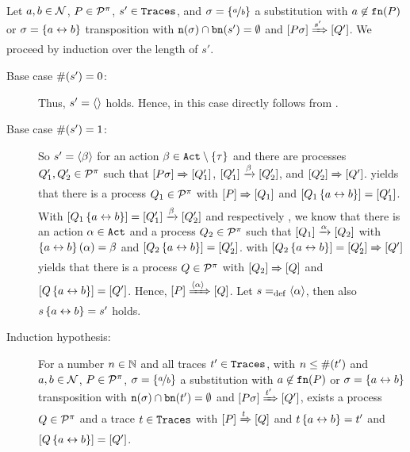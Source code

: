 \begin{prf}
Let $a,b\in\mathcal N$, $P\in\mathcal P^{\pi}$, $s'\in\mathtt{Traces}$, and $\sigma=\left\{\nicefrac{a}{b}\right\}$ a substitution with $a\not\in\mathtt{fn}(P)$ or $\sigma=\left\{a\leftrightarrow{}b\right\}$ transposition with $\mathtt{n}(\sigma)\cap\mathtt{bn}(s')=\emptyset$ and $\left[P\sigma\right]\xRightarrow{s'}\left[Q'\right]$. We proceed by induction over the length of $s'$.
\begin{description}
\item[Base case $\#(s')=0$:] Thus, $s'=\langle\rangle{}$ holds. Hence, in this case  directly follows from .

\item[Base case $\#(s')=1$:] So $s'=\langle\beta\rangle$ for an action $\beta\in\actions\setminus\set{\tau}$ and there are processes $Q_1',Q_2'\in\mathcal P^{\pi}$ such that $\left[P\sigma\right]\xRightarrow{}\left[Q_1'\right]$, $\left[Q_1'\right]\xrightarrow{\beta}\left[Q_2'\right]$, and $\left[Q_2'\right]\xRightarrow{}\left[Q'\right]$.  yields that there is a process $Q_1\in\mathcal P^{\pi}$ with $\left[P\right]\xRightarrow{}\left[Q_1\right]$ and $\left[Q_1\left\{a\leftrightarrow{}b\right\}\right]=\left[Q_1'\right]$. With $\left[Q_1\left\{a\leftrightarrow{}b\right\}\right]=\left[Q_1'\right]\xrightarrow{\beta}\left[Q_2'\right]$ and  respectively , we know that there is an action $\alpha\in\mathtt{Act}$ and a process $Q_2\in\mathcal P^{\pi}$ such that $\left[Q_1\right]\xrightarrow{\alpha}\left[Q_2\right]$ with $\left\{a\leftrightarrow{}b\right\}(\alpha)=\beta$ and $\left[Q_2\left\{a\leftrightarrow{}b\right\}\right]=\left[Q_2'\right]$.  with $\left[Q_2\left\{a\leftrightarrow{}b\right\}\right]=\left[Q_2'\right]\xRightarrow{}\left[Q'\right]$ yields that there is a process $Q\in\mathcal P^{\pi}$ with $\left[Q_2\right]\xRightarrow{}\left[Q\right]$ and $\left[Q\left\{a\leftrightarrow{}b\right\}\right]=\left[Q'\right]$. Hence, $\left[P\right]\xRightarrow{\langle\alpha\rangle}\left[Q\right]$. Let $s=_{\mathrm{def}}\langle\alpha\rangle$, then also $s\left\{a\leftrightarrow{}b\right\}=s'$ holds.

\item[Induction hypothesis:] For a number $n\in\mathbb N$ and all traces $t'\in\mathtt{Traces}$, with $n\leq\#(t')$ and $a,b\in\mathcal N$, $P\in\mathcal P^{\pi}$, $\sigma=\left\{\nicefrac{a}{b}\right\}$ a substitution with $a\not\in\mathtt{fn}(P)$ or $\sigma=\left\{a\leftrightarrow{}b\right\}$ transposition with $\mathtt{n}(\sigma)\cap\mathtt{bn}(t')=\emptyset$ and $\left[P\sigma\right]\xRightarrow{t'}\left[Q'\right]$, exists a process $Q\in\mathcal P^{\pi}$ and a trace $t\in\mathtt{Traces}$ with $\left[P\right]\xRightarrow{t}\left[Q\right]$ and $t\left\{a\leftrightarrow{}b\right\}=t'$ and $\left[Q\left\{a\leftrightarrow{}b\right\}\right]=\left[Q'\right]$.


\end{description}
\end{prf}
